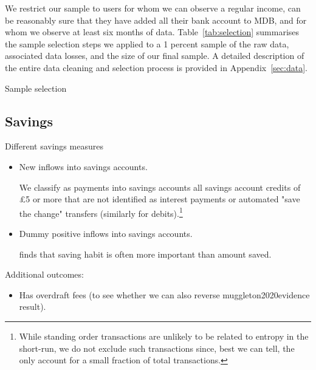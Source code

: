 We restrict our sample to users for whom we can observe a regular income, can
be reasonably sure that they have added all their bank account to MDB, and for
whom we observe at least six months of data. Table~\ref{tab:selection}
summarises the sample selection steps we applied to a 1 percent sample of the
raw data, associated data losses, and the size of our final sample. A detailed
description of the entire data cleaning and selection process is provided in
Appendix~\ref{sec:data}.

\begin{table}[H]
\caption{Sample selection}\label{tab:selection}

\end{table}



\subsection{Savings}
\label{par:outcome_variable_}

Different savings measures
\begin{itemize}

    \item New inflows into savings accounts.

        We classify as payments into savings
        accounts all savings account credits of \pounds5 or more that are not
        identified as interest payments or automated "save the change"
        transfers (similarly for debits).\footnote{While standing order transactions are unlikely to be
        related to entropy in the short-run, we do not exclude such
    transactions since, best we can tell, the only account for a small fraction
of total transactions.} 

    \item Dummy positive inflows into savings accounts.

    \citet{mps2018building} finds that saving habit is often more important
    than amount saved.

\end{itemize}


Additional outcomes:
\begin{itemize}
    \item Has overdraft fees (to see whether we can also reverse
        muggleton2020evidence result).
\end{itemize}




